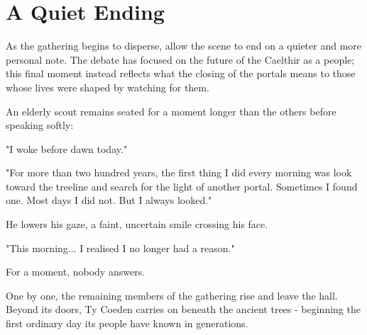 \section*{A Quiet Ending}
{\entryfont As the gathering begins to disperse, allow the scene to end on a quieter and more personal note. The debate has focused on the future of the Caelthir as a people; this final moment instead reflects what the closing of the portals means to those whose lives were shaped by watching for them.

An elderly scout remains seated for a moment longer than the others before speaking softly:}
\begin{DndReadAloud}
	"I woke before dawn today."

	"For more than two hundred years, the first thing I did every morning was look toward the treeline and search for the light of another portal. Sometimes I found one. Most days I did not. But I always looked."

	He lowers his gaze, a faint, uncertain smile crossing his face.

	"This morning... I realised I no longer had a reason."

	For a moment, nobody answers.

	One by one, the remaining members of the gathering rise and leave the hall. Beyond its doors, Ty Coeden carries on beneath the ancient trees - beginning the first ordinary day its people have known in generations.
\end{DndReadAloud}